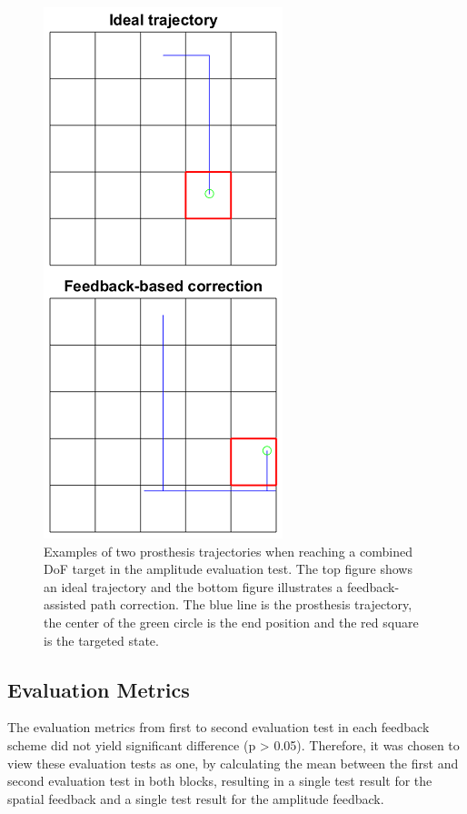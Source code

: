 \begin{figure}[h]                 
	\includegraphics[width=.75\textwidth]{figures/trajectories}
	\caption{Examples of two prosthesis trajectories when reaching a combined DoF target in the amplitude evaluation test. The top figure shows an ideal trajectory and the bottom figure illustrates a feedback-assisted path correction. The blue line is the prosthesis trajectory, the center of the green circle is the end position and the red square is the targeted state.}
	\label{fig:pa:trajec} 
\end{figure}

\subsection{Evaluation Metrics}
The evaluation metrics from first to second evaluation test in each feedback scheme did not yield significant difference (p > 0.05). Therefore, it was chosen to view these evaluation tests as one, by calculating the mean between the first and second evaluation test in both blocks, resulting in a single test result for the spatial feedback and a single test result for the amplitude feedback. 

